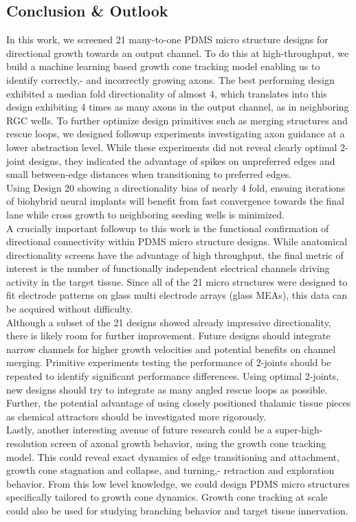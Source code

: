 \subsection{Conclusion \& Outlook}
In this work, we screened 21 many-to-one PDMS micro structure designs for
directional growth towards an output channel. To do this at high-throughput, we
build a machine learning based growth cone tracking model enabling us to
identify correctly,- and incorrectly growing axons. The best performing design
exhibited a median fold directionality of almost 4, which translates into this
design exhibiting 4 times as many axons in the output channel, as in neighboring
RGC wells. To further optimize design primitives such as merging structures and
rescue loops, we designed followup experiments investigating axon guidance at a
lower abstraction level. While these experiments did not reveal clearly optimal
2-joint designs, they indicated the advantage of spikes on unpreferred edges and
small between-edge distances when transitioning to preferred edges. \\
Using Design 20 showing a directionality bias of nearly 4 fold, ensuing
iterations of biohybrid neural implants will benefit from fast convergence
towards the final lane while cross growth to neighboring seeding wells is
minimized. \\

A crucially important followup to this work is the functional confirmation of
directional connectivity within PDMS micro structure designs. While anatomical
directionality screens have the advantage of high throughput, the final metric
of interest is the number of functionally independent electrical channels
driving activity in the target tissue. Since all of the 21 micro structures were
designed to fit electrode patterns on glass multi electrode arrays (glass
MEAs), this data can be acquired without difficulty. \\

Although a subset of the 21 designs showed already impressive directionality,
there is likely room for further improvement. Future designs should integrate
narrow channels for higher growth velocities and potential benefits on channel
merging. Primitive experiments testing the performance of 2-joints should be
repeated to identify significant performance differences. Using optimal
2-joints, new designs should try to integrate as many angled rescue loops as
possible. Further, the potential advantage of using closely positioned thalamic
tissue pieces as chemical attractors should be investigated more rigorously. \\

Lastly, another interesting avenue of future research could be a
super-high-resolution screen of axonal growth behavior, using the growth cone
tracking model. This could reveal exact dynamics of edge transitioning and
attachment, growth cone stagnation and collapse, and turning,- retraction and
exploration behavior. From this low level knowledge, we could design PDMS micro
structures specifically tailored to growth cone dynamics. Growth cone tracking
at scale could also be used for studying branching behavior and target tissue
innervation.